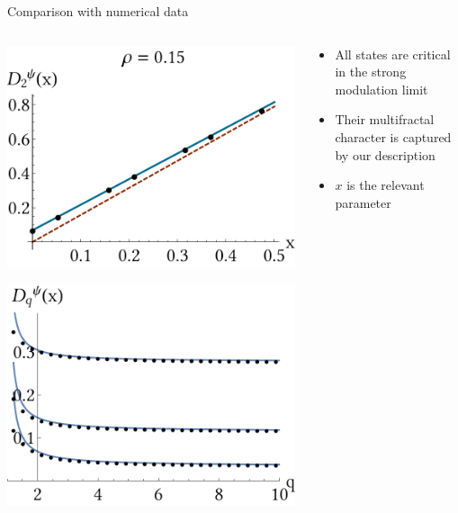 \documentclass[xcolor=x11names,compress,professionalfonts]{beamer}
\renewcommand{\(}{\begin{columns}}
\renewcommand{\)}{\end{columns}}
\newcommand{\<}[1]{\begin{column}{#1}}
\renewcommand{\>}{\end{column}}
\begin{document}
\begin{frame}{Comparison with numerical data}
\begin{columns}
	\begin{column}{5cm}
		\centering
  		\includegraphics[scale=.4]{local_wf.pdf}
  		
  		\includegraphics[scale=.4]{local_wf_q.pdf}
	\end{column}
	\begin{column}{5cm}
		\begin{itemize}
			\item All states are critical in the strong modulation limit
			\item Their multifractal character is captured by our description
			\item $x$ is the relevant parameter
		\end{itemize}
	\end{column}
\end{columns}
\end{frame}
\end{document}
